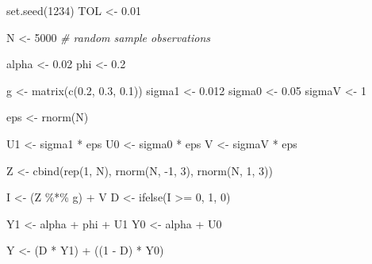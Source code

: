 \documentclass[9pt,twocolumn,twoside,]{pnas-new}
\newenvironment{Shaded}{}{}
\newcommand{\CommentTok}[1]{\textcolor[rgb]{0.38,0.63,0.69}{\textit{#1}}}
\newcommand{\DecValTok}[1]{\textcolor[rgb]{0.25,0.63,0.44}{#1}}
\newcommand{\FloatTok}[1]{\textcolor[rgb]{0.25,0.63,0.44}{#1}}
\newcommand{\FunctionTok}[1]{\textcolor[rgb]{0.02,0.16,0.49}{#1}}
\newcommand{\NormalTok}[1]{#1}
\newcommand{\OtherTok}[1]{\textcolor[rgb]{0.00,0.44,0.13}{#1}}
\newcommand{\SpecialCharTok}[1]{\textcolor[rgb]{0.25,0.44,0.63}{#1}}
\begin{document}
\begin{Shaded}
\begin{Highlighting}[]
\FunctionTok{set.seed}\NormalTok{(}\DecValTok{1234}\NormalTok{)}
\NormalTok{TOL }\OtherTok{\textless{}{-}} \FloatTok{0.01}

\NormalTok{N }\OtherTok{\textless{}{-}} \DecValTok{5000} \CommentTok{\# random sample observations}

\NormalTok{alpha }\OtherTok{\textless{}{-}} \FloatTok{0.02}
\NormalTok{phi }\OtherTok{\textless{}{-}} \FloatTok{0.2}

\NormalTok{g }\OtherTok{\textless{}{-}} \FunctionTok{matrix}\NormalTok{(}\FunctionTok{c}\NormalTok{(}\FloatTok{0.2}\NormalTok{, }\FloatTok{0.3}\NormalTok{, }\FloatTok{0.1}\NormalTok{))}
\NormalTok{sigma1 }\OtherTok{\textless{}{-}} \FloatTok{0.012}
\NormalTok{sigma0 }\OtherTok{\textless{}{-}} \FloatTok{0.05}
\NormalTok{sigmaV }\OtherTok{\textless{}{-}} \DecValTok{1}

\NormalTok{eps }\OtherTok{\textless{}{-}} \FunctionTok{rnorm}\NormalTok{(N)}

\NormalTok{U1 }\OtherTok{\textless{}{-}}\NormalTok{ sigma1 }\SpecialCharTok{*}\NormalTok{ eps}
\NormalTok{U0 }\OtherTok{\textless{}{-}}\NormalTok{ sigma0 }\SpecialCharTok{*}\NormalTok{ eps}
\NormalTok{V }\OtherTok{\textless{}{-}}\NormalTok{ sigmaV }\SpecialCharTok{*}\NormalTok{ eps}

\NormalTok{Z }\OtherTok{\textless{}{-}} \FunctionTok{cbind}\NormalTok{(}\FunctionTok{rep}\NormalTok{(}\DecValTok{1}\NormalTok{, N),}
           \FunctionTok{rnorm}\NormalTok{(N, }\SpecialCharTok{{-}}\DecValTok{1}\NormalTok{, }\DecValTok{3}\NormalTok{),}
           \FunctionTok{rnorm}\NormalTok{(N, }\DecValTok{1}\NormalTok{, }\DecValTok{3}\NormalTok{))}

\NormalTok{I }\OtherTok{\textless{}{-}}\NormalTok{ (Z }\SpecialCharTok{\%*\%}\NormalTok{ g) }\SpecialCharTok{+}\NormalTok{ V}
\NormalTok{D }\OtherTok{\textless{}{-}} \FunctionTok{ifelse}\NormalTok{(I }\SpecialCharTok{\textgreater{}=} \DecValTok{0}\NormalTok{, }\DecValTok{1}\NormalTok{, }\DecValTok{0}\NormalTok{)}

\NormalTok{Y1 }\OtherTok{\textless{}{-}}\NormalTok{ alpha }\SpecialCharTok{+}\NormalTok{ phi }\SpecialCharTok{+}\NormalTok{ U1}
\NormalTok{Y0 }\OtherTok{\textless{}{-}}\NormalTok{ alpha }\SpecialCharTok{+}\NormalTok{ U0}

\NormalTok{Y }\OtherTok{\textless{}{-}}\NormalTok{ (D }\SpecialCharTok{*}\NormalTok{ Y1) }\SpecialCharTok{+}\NormalTok{ ((}\DecValTok{1} \SpecialCharTok{{-}}\NormalTok{ D) }\SpecialCharTok{*}\NormalTok{ Y0)}


\end{Highlighting}
\end{Shaded}
\end{document}
